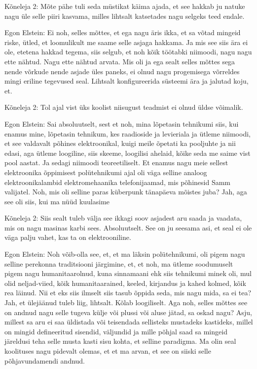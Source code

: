 Kõneleja 2:
Mõte pähe tuli seda müstikat käima ajada, et see hakkab ju natuke nagu üle selle piiri kasvama, milles lihtsalt katsetades nagu selgeks teed endale.
                 
Egon Elstein:
Ei noh, selles mõttes, et ega nagu äris ikka, et sa võtad mingeid riske, ütled, et loomulikult me saame selle asjaga hakkama. Ja mis see siis ära ei ole, etetena hakkad tegema, siis selgub, et noh kõik töötabki niimoodi, nagu nagu ette nähtud. Nagu ette nähtud arvata.
Mis oli ja ega sealt selles mõttes sega nende võrkude nende asjade üles paneks, ei olnud nagu progemisega võrreldes mingi eriline tegevused seal. Lihtsalt konfigureerida süsteemi ära ja jalutad koju, et.
                 
Kõneleja 2:
Tol ajal vist üks koolist niisugust teadmist ei olnud üldse võimalik.
                 
Egon Elstein:
Sai absoluutselt, sest et noh, mina lõpetasin tehnikumi siis, kui enamus mine, lõpetasin tehnikum, kes raadioside ja levieriala ja ütleme niimoodi, et see valdavalt põhines elektroonikal, kuigi meile õpetati ka pooljuhte ja nii edasi, aga ütleme loogiline, siis skeeme, loogilisi ahelaid, kõike seda me saime vist pool aastat. Ja sedagi niimoodi teoreetiliselt.
Et enamus nagu meie sellest elektroonika õppimisest polütehnikumi ajal oli väga selline analoog elektroonikalambid elektromehaanika telefonijaamad, mis põhinesid Samm valijatel.
Noh, mis oli selline paras küberpunk tänapäeva mõistes juba? Jah, aga see oli siis, kui ma nüüd kuulasime
                 
Kõneleja 2:
Siis sealt tuleb välja see ikkagi soov asjadest aru saada ja vaadata, mis on nagu masinas karbi sees. Absoluutselt. See on ju seesama asi, et seal ei ole väga palju vahet, kas ta on elektrooniline.
                 
Egon Elstein:
Noh võib-olla see, et, et ma läksin polütehnikumi, oli pigem nagu selline perekonna traditsiooni järgimine, et, et noh, ma ütleme soodumuselt pigem nagu humanitaarolnud, kuna sinnamaani ehk siis tehnikumi minek oli, mul olid neljad-viied, kõik humanitaarained, keeled, kirjandus ja kahed kolmed, kõik rea läinud.
Nii et eks siis ilmselt siis tasub õppida seda, mis nagu mida, sa ei tea? Jah, et ülejäänud tuleb liig, lihtsalt. Kõlab loogiliselt.
Aga noh, selles mõttes see on andnud nagu selle tugeva külje või plussi või aluse jätad, sa oskad nagu?
Asju, millest sa aru ei saa üldistada või teisendada sellisteks mustadeks kastideks, millel on mingid defineeritud sisendid, väljundid ja mille põhjal saad sa mingeid järeldusi teha selle musta kasti sisu kohta, et selline paradigma. Ma olin seal koolituses nagu pidevalt olemas, et et ma arvan, et see on siiski selle põhjavundamendi andnud.
                 
